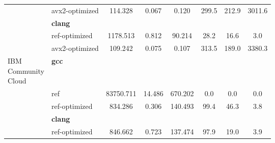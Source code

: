 \begin{table}[H]
\begin{tabularx}{\linewidth}{l l c c c c c c}
          & avx2-optimized & 114.328 & 0.067 & 0.120 & 299.5 & 212.9 & 3011.6\\
          & \textbf{clang} & & & & & \\
          & ref-optimized & 1178.513 & 0.812 & 90.214 & 28.2 & 16.6 & 3.0\\
          & avx2-optimized & 109.242 & 0.075 & 0.107 & 313.5 & 189.0 & 3380.3\\
          \midrule
          \multirowcell{5}{IBM\\ Community\\ Cloud}
          & \textbf{gcc} & & & & & \\
          & ref & 83750.711 & 14.486 & 670.202 & 0.0 & 0.0 & 0.0\\
          & ref-optimized & 834.286 & 0.306 & 140.493 & 99.4 & 46.3 & 3.8\\
          & \textbf{clang} & & & & & \\
          & ref-optimized & 846.662 & 0.723 & 137.474 & 97.9 & 19.0 & 3.9\\
        \bottomrule
    \end{tabularx}
\end{table}